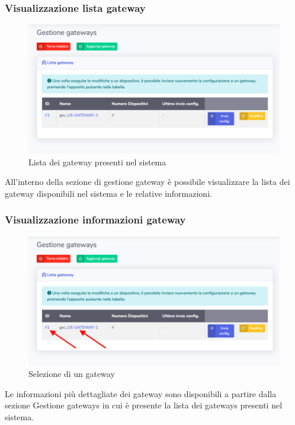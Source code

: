 	\subsubsection{Visualizzazione lista gateway}

		\begin{figure}[H]
		\centering
		\includegraphics[scale=0.600]{res/images/admin/listaGateway.png}
		\caption{Lista dei gateway presenti nel sistema}
	\end{figure}

		All'interno della sezione di gestione gateway è possibile visualizzare la lista dei gateway disponibili nel sistema e le relative informazioni.

	\subsubsection{Visualizzazione informazioni gateway}

		\begin{figure}[H]
		\centering
		\includegraphics[scale=0.600]{res/images/admin/selDettGateway.png}
		\caption{Selezione di un gateway}
	\end{figure}


		Le informazioni più dettagliate dei gateway sono disponibili a partire dalla sezione Gestione gateways in cui è presente la lista dei gateways presenti nel sistema.

